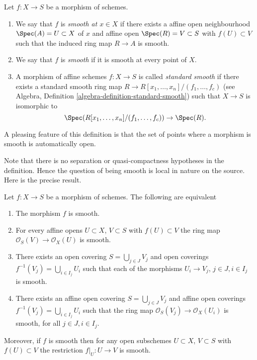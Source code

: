 \begin{definition}
\label{definition-smooth}
Let $f : X \to S$ be a morphism of schemes.
\begin{enumerate}
\item We say that $f$ is {\it smooth at $x \in X$} if
there exists a affine open neighbourhood $\Spec(A) = U \subset X$
of $x$ and affine open $\Spec(R) = V \subset S$
with $f(U) \subset V$ such that the induced ring map
$R \to A$ is smooth.
\item We say that $f$ is {\it smooth} if it is smooth at every point of $X$.
\item A morphism of affine schemes $f : X \to S$
is called {\it standard smooth} if there exists a standard smooth ring
map $R \to R[x_1, \ldots, x_n]/(f_1, \ldots, f_c)$ (see
Algebra, Definition \ref{algebra-definition-standard-smooth})
such that $X \to S$ is isomorphic to
$$
\Spec(R[x_1, \ldots, x_n]/(f_1, \ldots, f_c)) \to \Spec(R).
$$
\end{enumerate}
\end{definition}

\noindent
A pleasing feature of this definition is that the set of points
where a morphism is smooth is automatically open.

\medskip\noindent
Note that there is no separation or quasi-compactness hypotheses in the
definition. Hence the question of being smooth is local in nature on
the source. Here is the precise result.

\begin{lemma}
\label{lemma-smooth-characterize}
Let $f : X \to S$ be a morphism of schemes.
The following are equivalent
\begin{enumerate}
\item The morphism $f$ is smooth.
\item For every affine opens $U \subset X$, $V \subset S$
with $f(U) \subset V$ the ring map
$\mathcal{O}_S(V) \to \mathcal{O}_X(U)$ is smooth.
\item There exists an open covering $S = \bigcup_{j \in J} V_j$
and open coverings $f^{-1}(V_j) = \bigcup_{i \in I_j} U_i$ such
that each of the morphisms $U_i \to V_j$, $j\in J, i\in I_j$
is smooth.
\item There exists an affine open covering $S = \bigcup_{j \in J} V_j$
and affine open coverings $f^{-1}(V_j) = \bigcup_{i \in I_j} U_i$ such
that the ring map $\mathcal{O}_S(V_j) \to \mathcal{O}_X(U_i)$ is
smooth, for all $j\in J, i\in I_j$.
\end{enumerate}
Moreover, if $f$ is smooth then for
any open subschemes $U \subset X$, $V \subset S$ with $f(U) \subset V$
the restriction $f|_U : U \to V$ is smooth.
\end{lemma}

